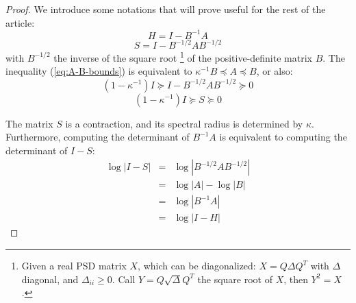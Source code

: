 \begin{proof} We introduce some notations that will prove useful
for the rest of the article: 
\[
H=I-B^{-1}A
\]
\[
S=I-B^{-1/2}AB^{-1/2}
\]
with $B^{-1/2}$ the inverse of the square root%
\footnote{Given a real PSD matrix $X$, which can be diagonalized: $X=Q\Delta Q^{T}$
with $\Delta$ diagonal, and $\Delta_{ii}\geq0$. Call $Y=Q\sqrt{\Delta}Q^{T}$
the square root of $X$, then $Y^{2}=X$.%
} of the positive-definite matrix $B$. The inequality (\ref{eq:A-B-bounds})
is equivalent to $\kappa^{-1}B\preceq A\preceq B$, or also: 
\[
\left(1-\kappa^{-1}\right)I\succeq I-B^{-1/2}AB^{-1/2}\succeq0
\]
\begin{equation}
\left(1-\kappa^{-1}\right)I\succeq S\succeq0\label{eq:s-encadrement}
\end{equation}


The matrix $S$ is a contraction, and its spectral radius is determined
by $\kappa$. Furthermore, computing the determinant of $B^{-1}A$
is equivalent to computing the determinant of $I-S$: 
\begin{eqnarray*}
\log\left|I-S\right| & = & \log\left|B^{-1/2}AB^{-1/2}\right|\\
 & = & \log\left|A\right|-\log\left|B\right|\\
 & = & \log\left|B^{-1}A\right|\\
 & = & \log\left|I-H\right|
\end{eqnarray*}



\end{proof}

